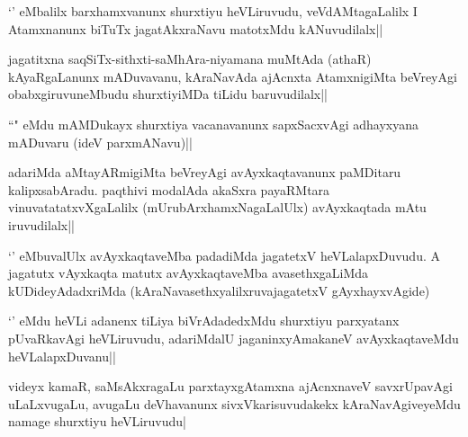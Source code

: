 
\begin{artha}
`\stext ' eMbalilx barxhamxvanunx shurxtiyu heVLiruvudu, veVdAMtagaLalilx I Atamxnanunx biTuTx jagatAkxraNavu matotxMdu kANuvudilalx||
\end{artha}


\begin{artha}
jagatitxna saqSiTx-sithxti-saMhAra-niyamana muMtAda (athaR) kAyaRgaLanunx mADuvavanu, kAraNavAda ajAcnxta AtamxnigiMta beVreyAgi obabxgiruvuneMbudu shurxtiyiMDa tiLidu baruvudilalx||
\end{artha}


\begin{artha}
``\stext " eMdu mAMDukayx shurxtiya vacanavanunx sapxSacxvAgi adhayxyana mADuvaru (ideV parxmANavu)||
\end{artha}

\begin{artha}
adariMda aMtayARmigiMta beVreyAgi avAyxkaqtavanunx paMDitaru kalipxsabAradu. paqthivi modalAda akaSxra payaRMtara vinuvatatatxvXgaLalilx (mUrubArxhamxNagaLalUlx) avAyxkaqtada mAtu iruvudilalx||
\end{artha}

\begin{artha}
`\stext ' eMbuvalUlx avAyxkaqtaveMba padadiMda jagatetxV heVLalapxDuvudu. A jagatutx vAyxkaqta matutx avAyxkaqtaveMba avasethxgaLiMda kUDideyAdadxriMda (kAraNavasethxyalilxruvajagatetxV gAyxhayxvAgide)

`\stext ' eMdu heVLi adanenx tiLiya biVrAdadedxMdu shurxtiyu parxyatanx pUvaRkavAgi heVLiruvudu, adariMdalU jaganinxyAmakaneV avAyxkaqtaveMdu heVLalapxDuvanu||
\end{artha}


\begin{artha}
videyx kamaR, saMsAkxragaLu parxtayxgAtamxna ajAcnxnaveV savxrUpavAgi uLaLxvugaLu, avugaLu deVhavanunx sivxVkarisuvudakekx kAraNavAgiveyeMdu namage shurxtiyu heVLiruvudu|
\end{artha}

